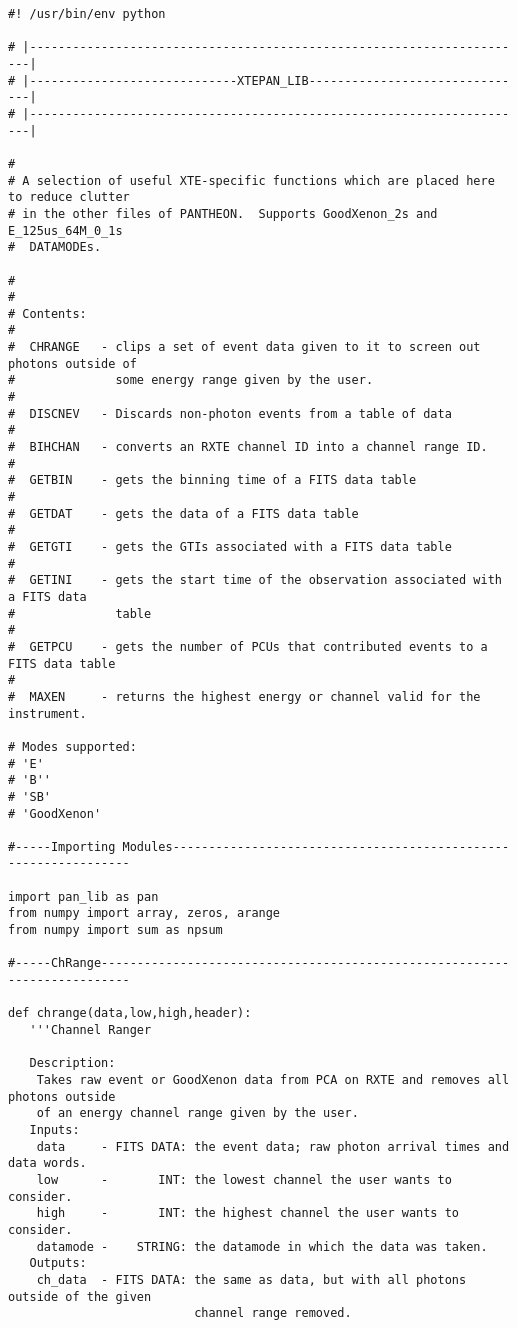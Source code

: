 \begin{verbatim}
#! /usr/bin/env python

# |----------------------------------------------------------------------|
# |-----------------------------XTEPAN_LIB-------------------------------|
# |----------------------------------------------------------------------|

# 
# A selection of useful XTE-specific functions which are placed here to reduce clutter
# in the other files of PANTHEON.  Supports GoodXenon_2s and E_125us_64M_0_1s
#  DATAMODEs.

# 
#
# Contents:
#
#  CHRANGE   - clips a set of event data given to it to screen out photons outside of 
#              some energy range given by the user.
#
#  DISCNEV   - Discards non-photon events from a table of data
# 
#  BIHCHAN   - converts an RXTE channel ID into a channel range ID.
#
#  GETBIN    - gets the binning time of a FITS data table
#
#  GETDAT    - gets the data of a FITS data table
#
#  GETGTI    - gets the GTIs associated with a FITS data table 
#
#  GETINI    - gets the start time of the observation associated with a FITS data
#              table
#
#  GETPCU    - gets the number of PCUs that contributed events to a FITS data table
#
#  MAXEN     - returns the highest energy or channel valid for the instrument.

# Modes supported:
# 'E'
# 'B''
# 'SB'
# 'GoodXenon' 

#-----Importing Modules----------------------------------------------------------------

import pan_lib as pan
from numpy import array, zeros, arange
from numpy import sum as npsum

#-----ChRange--------------------------------------------------------------------------

def chrange(data,low,high,header):
   '''Channel Ranger
   
   Description:
    Takes raw event or GoodXenon data from PCA on RXTE and removes all photons outside
    of an energy channel range given by the user.
   Inputs:
    data     - FITS DATA: the event data; raw photon arrival times and data words.
    low      -       INT: the lowest channel the user wants to consider.
    high     -       INT: the highest channel the user wants to consider.
    datamode -    STRING: the datamode in which the data was taken.
   Outputs:
    ch_data  - FITS DATA: the same as data, but with all photons outside of the given
                          channel range removed.


\end{verbatim}
